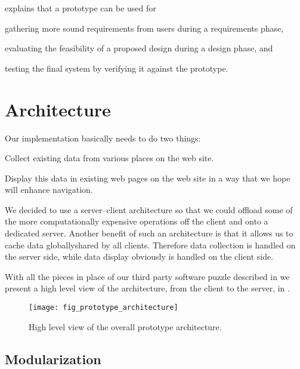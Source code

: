 \citet[pp.~409--410]{sommerville07} explains that a prototype can be used for
\begin{inparaenum}[(i)]
  \item gathering more sound requirements from users during a
    requirements phase,
  \item evaluating the feasibility of a proposed design during a
    design phase, and
  \item testing the final system by verifying it against the prototype.
\end{inparaenum}


\section{Architecture}

Our implementation basically needs to do two things:

\begin{enum}
  \item Collect existing data from various places on the \urort web site.
  \item Display this data in existing web pages on the \urort web site in
    a way that we hope will enhance navigation.
\end{enum}

We decided to use a server--client architecture so that we could offload some
of the more computationally expensive operations off the client and onto a
dedicated server. Another benefit of such an architecture is that it allows us
to cache data globally\dash{}shared by all clients. Therefore data collection
is handled on the server side, while data display obviously is handled on
the client side.

With all the pieces in place of our third party software puzzle described in
we present a high level view of the architecture, from the client to the
server, in
.

\begin{figure}
  \begin{whole}
    \centering
    \texttt{[image: fig\_prototype\_architecture]}
    \caption[Prototype Architecture]{
      High level view of the overall prototype architecture.
    }
    \label{figure:fig.prototype.architecture}
  \end{whole}
\end{figure}


\subsection{Modularization}

